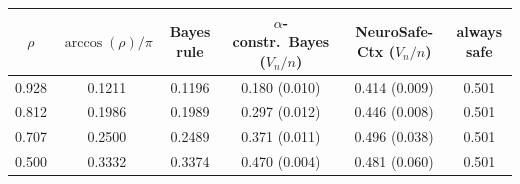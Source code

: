 \begin{tabular}{cccccc}
\toprule
$\rho$ & $\arccos(\rho)/\pi$ & Bayes rule & $\alpha$-constr.\ Bayes ($V_n/n$) & NeuroSafe-Ctx ($V_n/n$) & always safe \\
\midrule
0.928 & 0.1211 & 0.1196 & 0.180 (0.010) & 0.414 (0.009) & 0.501 \\
0.812 & 0.1986 & 0.1989 & 0.297 (0.012) & 0.446 (0.008) & 0.501 \\
0.707 & 0.2500 & 0.2489 & 0.371 (0.011) & 0.496 (0.038) & 0.501 \\
0.500 & 0.3332 & 0.3374 & 0.470 (0.004) & 0.481 (0.060) & 0.501 \\
\bottomrule
\end{tabular}
